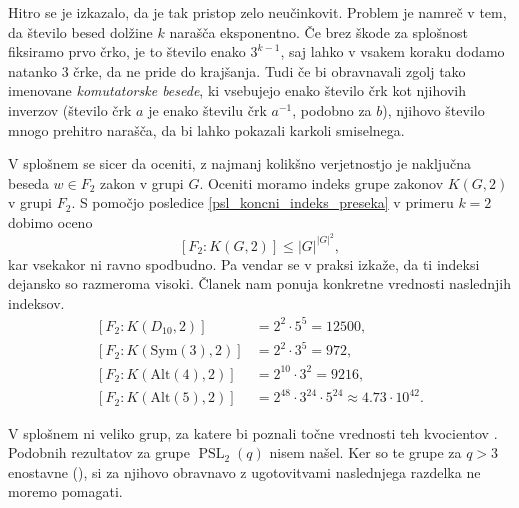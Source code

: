   


Hitro se je izkazalo, da je tak pristop zelo neučinkovit. Problem je namreč v tem, da število besed dolžine $k$ narašča eksponentno. Če brez škode za splošnost fiksiramo prvo črko, je to število enako $3^{k - 1}$,
saj lahko v vsakem koraku dodamo natanko 3 črke, da ne pride do krajšanja. Tudi če bi obravnavali zgolj tako imenovane \emph{komutatorske besede}, ki vsebujejo enako število črk kot njihovih inverzov (število črk $a$ je enako številu črk $a^{-1}$, podobno za $b$),
njihovo število mnogo prehitro narašča, da bi lahko pokazali karkoli smiselnega.

V splošnem se sicer da oceniti, z najmanj kolikšno verjetnostjo je naključna beseda $w \in F_2$ zakon v grupi $G$.
Oceniti moramo indeks grupe zakonov $K(G, 2)$ v grupi $F_2$. S pomočjo posledice \ref{psl_koncni_indeks_preseka} v primeru $k  = 2$ dobimo oceno
\begin{equation*}
    \left[ F_2 : K(G, 2) \right] \le {\lvert G \rvert}^{{\lvert G \rvert}^2},
    \end{equation*}  
kar vsekakor ni ravno spodbudno. Pa vendar se v praksi izkaže, da ti indeksi dejansko so razmeroma visoki. Članek \cite{Cocke_2020} nam ponuja konkretne vrednosti naslednjih indeksov.
\begin{align*}
    \left[ F_2 : K(D_{10}, 2) \right] &= 2^2 \cdot 5^{5} = 12500, \\
    \left[ F_2 : K(\text{Sym}(3), 2) \right] &= 2^2 \cdot 3^{5} = 972, \\
    \left[ F_2 : K(\text{Alt}(4), 2) \right] &= 2^{10} \cdot  3^{2} = 9216, \\
    \left[ F_2 : K(\text{Alt}(5), 2) \right] &= 2^{48} \cdot  3^{24} \cdot 5^{24} \approx 4.73 \cdot 10^{42}.   %
\end{align*}

V splošnem ni veliko grup, za katere bi poznali točne vrednosti teh kvocientov \cite[str.~1]{Cocke_2020}. Podobnih rezultatov za grupe $\operatorname{PSL}_2(q)$ nisem našel. Ker so te grupe za $q > 3$ enostavne (\cite{Jezernik_2023}), si za njihovo obravnavo
z ugotovitvami naslednjega razdelka ne moremo pomagati.

